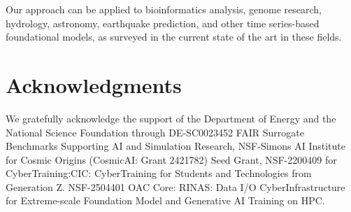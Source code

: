 \documentclass[conference]{IEEEtran}
\begin{document}
Our approach can be applied to bioinformatics analysis, genome research, hydrology, astronomy, earthquake prediction, and other time series-based foundational models, as surveyed in the current state of the art in these fields.


\section*{Acknowledgments}
We gratefully acknowledge the support of the Department of Energy and the National Science Foundation through DE-SC0023452 FAIR Surrogate Benchmarks Supporting AI and Simulation Research, NSF-Simons AI Institute for Cosmic Origins (CosmicAI: Grant 2421782) Seed Grant, NSF-2200409 for CyberTraining:CIC: CyberTraining for
Students and Technologies from Generation Z. NSF-2504401 OAC Core: RINAS: Data I/O CyberInfrastructure
for Extreme-scale Foundation Model and Generative AI
Training on HPC.


%


\end{document}
